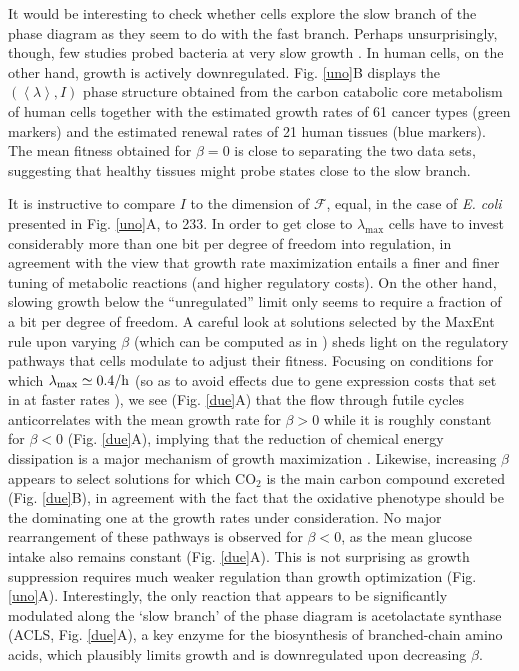 \documentclass[superscriptaddress,amsmath,amssymb,twocolumn]{revtex4-1}
\newcommand{\avg}[1]{\left\langle #1 \right\rangle}
\begin{document}
It would be interesting to check whether cells explore the slow branch of the phase diagram as they seem to do with the fast branch. Perhaps unsurprisingly, though, few studies probed bacteria at very slow growth \cite{slowcoli}. In human cells, on the other hand, growth is actively downregulated. Fig. \ref{uno}B displays the $(\avg{\lambda},I)$ phase structure obtained from the carbon catabolic core metabolism of human cells \cite{capu} together with the estimated growth rates of 61 cancer types (green markers) and the estimated renewal rates of 21 human tissues (blue markers). The mean fitness obtained for $\beta=0$ is close to separating the two data sets, suggesting that healthy tissues might probe states close to the slow branch. 

It is instructive to compare $I$ to the dimension of $\mathcal{F}$, equal, in the case of {\it E. coli} presented in Fig. \ref{uno}A, to 233. %
In order to get close to $\lambda_{\max}$ cells have to invest considerably more than one bit per degree of freedom into regulation, in agreement with the view that growth rate maximization entails a finer and finer tuning of metabolic reactions (and higher regulatory costs). On the other hand, slowing growth below the ``unregulated'' limit only seems to require a fraction of a bit per degree of freedom. A careful look at solutions selected by the MaxEnt rule upon varying $\beta$ (which can be computed as in \cite{physbio}) sheds light on the regulatory pathways that cells modulate to adjust their fitness. Focusing on conditions for which $\lambda_{\max}\simeq 0.4/{\rm h}$ (so as to avoid effects due to gene expression costs that set in at faster rates \cite{cafba}), we see (Fig. \ref{due}A) that the flow through futile cycles anticorrelates with the mean growth rate for $\beta>0$ while it is roughly constant for $\beta<0$ (Fig. \ref{due}A), implying that the reduction  of chemical energy dissipation is a major mechanism of growth maximization \cite{physbio}. Likewise, increasing $\beta$ appears to select solutions for which CO$_2$ is the main carbon compound excreted (Fig. \ref{due}B), in agreement with the fact that the oxidative phenotype should be the dominating one at the growth rates under consideration. No major rearrangement of these pathways is observed for $\beta<0$, as the mean glucose intake also remains constant (Fig. \ref{due}A). This is not surprising as growth suppression requires much weaker regulation than growth optimization (Fig. \ref{uno}A). Interestingly, the only reaction that appears to be significantly modulated along the `slow branch' of the phase diagram is acetolactate synthase (ACLS, Fig. \ref{due}A), a key enzyme for the biosynthesis of branched-chain amino acids, which plausibly limits growth and is downregulated upon decreasing $\beta$. 
\end{document}
